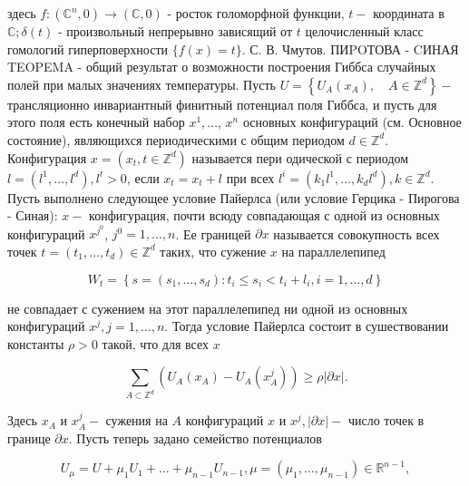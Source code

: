 \documentclass[10pt]{article}
\begin{document}
здесь $f:\left(\mathbb{C}^{n}, 0\right) \rightarrow(\mathbb{C}, 0)$ - росток голоморфной функции, $t-$ координата в $\mathbb{C} ; \delta(t)$ - произвольный непрерывно зависящий от $t$ целочисленный класс гомологий гиперповерхности $\{f(x)=t\}$. С. В. Чмутов. ПИPOТОВА - CИНАЯ TEOPEMA - общий результат о возможности построения Гиббса случайных полей при малых значениях температуры. Пусть $U=\left\{U_{A}\left(x_{A}\right), \quad A \in \mathbb{Z}^{d}\right\}-$ трансляционно инвариантный финитный потенциал поля Гиббса, и пусть для этого поля есть конечный набор $x^{1}, \ldots$, $x^{n}$ основных конфигураций (см. Основное состояние), являющихся периодическими с общим периодом $d \in \mathbb{Z}^{d}$. Конфигурация $x=\left(x_{t}, t \in \mathbb{Z}^{d}\right)$ называется пери одической с периодом $l=\left(l^{1}, \ldots, l^{d}\right), l^{t}>0$, если $x_{t}=x_{t}+l$ при всех $l^{i}=\left(k_{1} l^{1}, \ldots, k_{d} l^{d}\right), k \in \mathbb{Z}^{d}$. Пусть выполнено следующее условие Пайерлса (или условие Герцика - Пирогова - Синая): $x-$ конфигурация, почти всюду совпадающая с одной из основных конфигураций $x^{j^{0}}$, $j^{0}=1, \ldots, n$. Ее границей $\partial x$ называется совокупность всех точек $t=\left(t_{1}, \ldots, t_{d}\right) \in \mathbb{Z}^{d}$ таких, что сужение $x$ на параллелепипед



\[

W_{t}=\left\{s=\left(s_{1}, \ldots, s_{d}\right): t_{i} \leqslant s_{i}<t_{i}+l_{i}, i=1, \ldots, d\right\}

\]



не совпадает с сужением на этот параллелепипед ни одной из основных конфигураций $x^{j}, j=1, \ldots, n$. Тогда условие Пайерлса состоит в сушествовании константы $\rho>0$ такой, что для всех $x$



\[

\sum_{A \subset \mathbb{Z}^{d}}\left(U_{A}\left(x_{A}\right)-U_{A}\left(x_{A}^{j}\right)\right) \geqslant \rho|\partial x| .

\]



Здесь $x_{A}$ и $x_{A}^{j}-$ сужения на $A$ конфигураций $x$ и $x^{j},|\partial x|-$ число точек в границе $\partial x$. Пусть теперь задано семейство потенциалов



\[

U_{\mu}=U+\mu_{1} U_{1}+\ldots+\mu_{n-1} U_{n-1}, \mu=\left(\mu_{1}, \ldots, \mu_{n-1}\right) \in \mathbb{R}^{n-1},

\]
\end{document}
